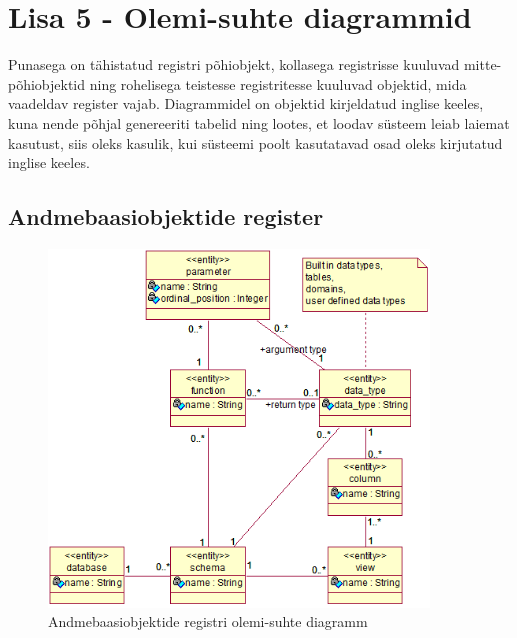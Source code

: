 \documentclass[a4paper,12pt]{article} %
\begin{document}
\section*{Lisa 5 - Olemi-suhte diagrammid}
\label{lisa_olemi_suhte_diagrammid}
Punasega on tähistatud registri põhiobjekt, kollasega registrisse kuuluvad mitte-põhiobjektid ning rohelisega teistesse registritesse kuuluvad objektid, mida vaadeldav register vajab. Diagrammidel on objektid kirjeldatud inglise keeles, kuna nende põhjal genereeriti tabelid ning lootes, et loodav süsteem leiab laiemat kasutust, siis oleks kasulik, kui süsteemi poolt kasutatavad osad oleks kirjutatud inglise keeles.

\subsection*{Andmebaasiobjektide register}
\begin{figure}[H]
\centering
\includegraphics[width=0.9\textwidth]{./diagrams/database-object-er-diagram.png}
\caption{Andmebaasiobjektide registri olemi-suhte diagramm}
\label{fig_andmebaasiobjektide_registri_olemi_suhte_diagramm}
\end{figure}
\end{document}
